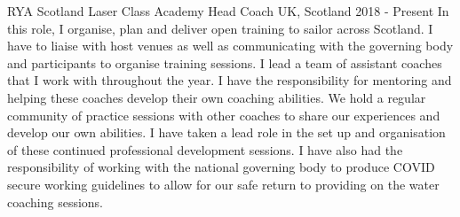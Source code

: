   \cventry
    {RYA Scotland} %
    {Laser Class Academy Head Coach} %
    {UK, Scotland} %
    {2018 - Present} %
    {
        In this role, I organise, plan and deliver open training to sailor 
        across Scotland. I have to liaise with host venues as well as 
        communicating with the governing body and participants to organise 
        training sessions. I lead a team of assistant coaches that I work 
        with throughout the year. I have the responsibility for mentoring and 
        helping these coaches develop their own coaching abilities. We hold a 
        regular community of practice sessions with other coaches to share 
        our experiences and develop our own abilities. I have taken a lead 
        role in the set up and organisation of these continued professional 
        development sessions.\newline
        I have also had the responsibility of working with the national 
        governing body to produce COVID secure working guidelines to allow 
        for our safe return to providing on the water coaching sessions.
            \newline
    }
